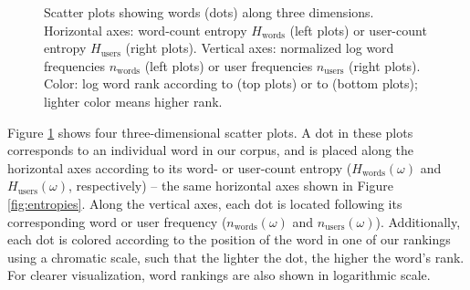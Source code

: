 \begin{figure}[t!]
 
   \caption{Scatter plots showing words (dots) along three dimensions. Horizontal axes: word-count entropy $H_\text{words}$ (left plots) or user-count entropy $H_\text{users}$ (right plots). Vertical axes: normalized log word frequencies $n_\text{words}$ (left plots) or user frequencies $n_\text{users}$ (right plots). Color: log word rank according to \wordrank*{} (top plots) or to \userrank*{} (bottom plots); lighter color means higher rank.}
   \label{fig:ivalue}
\end{figure}



Figure \ref{fig:ivalue} shows four three-dimensional scatter plots. A dot in these plots corresponds to an individual word in our corpus, and is placed along the horizontal axes according to its word- or user-count entropy ($H_\text{words}(\omega)$ and $H_\text{users}(\omega)$, respectively) -- the same horizontal axes shown in Figure \ref{fig:entropies}. Along the vertical axes, each dot is located following its corresponding word or user frequency ($n_\text{words}(\omega)$ and $n_\text{users}(\omega)$). Additionally, each dot is colored according to the position of the word in one of our rankings using a chromatic scale, such that the lighter the dot, the higher the word's rank. For clearer visualization, word rankings are also shown in logarithmic scale.

